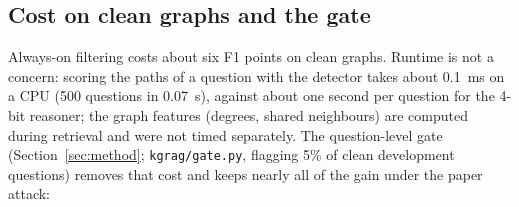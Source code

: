 \documentclass[preprint,12pt]{elsarticle}
\begin{document}
\subsection{Cost on clean graphs and the gate}\label{sec:clean}
\begin{table}[tbp]
\centering\small
{}
\caption{Cost of filtering on clean graphs (WebQSP-500, no attack). Gate rows C and D use strict labels, the others the original labels.}
\end{table}
Always-on filtering costs about six F1 points on clean graphs. Runtime is not a concern: scoring the paths of a question with the detector takes about 0.1~ms on a CPU (500 questions in 0.07~s), against about one second per question for the 4-bit reasoner; the graph features (degrees, shared neighbours) are computed during retrieval and were not timed separately. The question-level gate (Section~\ref{sec:method}; \texttt{kgrag/gate.py}, flagging 5\% of clean development questions) removes that cost and keeps nearly all of the gain under the paper attack:
\begin{table}[tbp]
\centering\small
{}
\caption{F1 of the dev-only variants (conformal threshold): always-on filter (A) and gate (C, D; strict labels).}
\end{table}
\end{document}
